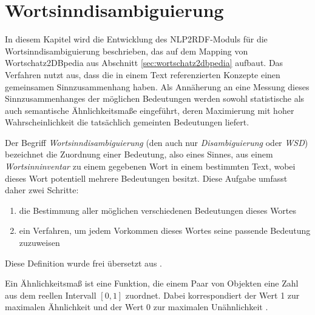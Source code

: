 \chapter{Wortsinndisambiguierung}\label{sec:disambiguierung}
In diesem Kapitel wird die Entwicklung des NLP2RDF-Moduls für die Wortsinndisambiguierung beschrieben, das auf dem Mapping von Wortschatz2DBpedia aus Abschnitt \ref{sec:wortschatz2dbpedia} aufbaut.
Das Verfahren nutzt aus, dass die in einem Text referenzierten Konzepte einen gemeinsamen Sinnzusammenhang haben.
Als Annäherung an eine Messung dieses Sinnzusammenhanges der möglichen Bedeutungen werden sowohl statistische als auch semantische Ähnlichkeitsmaße eingeführt, deren Maximierung mit hoher Wahrscheinlichkeit
die tatsächlich gemeinten Bedeutungen liefert.

\begin{dfn}
Der Begriff \emph{Wortsinndisambiguierung} (den auch nur \emph{Disambiguierung} oder \emph{WSD}) bezeichnet die Zuordnung einer Bedeutung, also eines Sinnes, aus einem \emph{Wortsinninventar} zu einem gegebenen Wort in einem bestimmten Text, wobei dieses Wort potentiell mehrere Bedeutungen besitzt.
Diese Aufgabe umfasst daher zwei Schritte:
\begin{enumerate}
 \item die Bestimmung aller möglichen verschiedenen Bedeutungen dieses Wortes
 \item ein Verfahren, um jedem Vorkommen dieses Wortes seine passende Bedeutung zuzuweisen
\end{enumerate}
Diese Definition wurde frei übersetzt aus \citet{wsd-stateoftheart}.
\end{dfn}

\begin{dfn}
Ein Ähnlichkeitsmaß ist eine Funktion, die einem Paar von Objekten eine Zahl aus dem reellen Intervall $[0, 1]$ zuordnet. Dabei korrespondiert der
Wert 1 zur maximalen Ähnlichkeit und der Wert 0 zur maximalen Unähnlichkeit \citep[][Seite 215]{aehnlichkeitssuche}.
\end{dfn}

